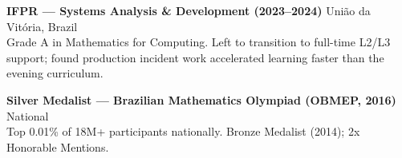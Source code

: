 \documentclass[11pt,letterpaper]{article}
\begin{document}
\textbf{IFPR --- Systems Analysis \& Development (2023--2024)} \hfill União da Vitória, Brazil \\
Grade A in Mathematics for Computing. Left to transition to full-time L2/L3 support; found production incident work accelerated learning faster than the evening curriculum.

\vspace{4pt}
\textbf{Silver Medalist --- Brazilian Mathematics Olympiad (OBMEP, 2016)} \hfill National \\
Top 0.01\% of 18M+ participants nationally. Bronze Medalist (2014); 2x Honorable Mentions.
\end{document}
